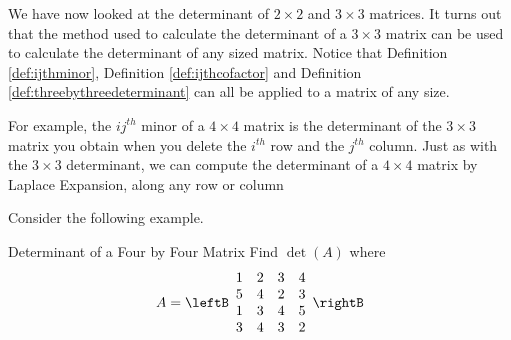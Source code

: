 We have now looked at the determinant of $2 \times 2$ and $3 \times 3$ matrices. It turns
out that the method used to calculate the determinant of a $3 \times 3$ matrix 
can be used to calculate the determinant of any sized matrix. Notice that
Definition \ref{def:ijthminor}, Definition \ref{def:ijthcofactor} and Definition \ref{def:threebythreedeterminant}
can all be applied to a matrix of any size. 

For example, the $ij^{th}$ minor of a $4 \times 4$ matrix is the determinant
of the $3 \times 3$ matrix you obtain when you delete the $i^{th}$ row and the $j^{th}$ column. 
Just as with the $3 \times 3$ determinant, we can compute the determinant of a $4 \times 4$ matrix by Laplace Expansion, 
along any row or column

Consider the following example. 

\begin{example}{Determinant of a Four by Four Matrix}\label{exa:fourbyfourdeterminant}
Find $\det \left( A\right) $ where
\begin{equation*}
A=\leftB
\begin{array}{rrrr}
1 & 2 & 3 & 4 \\
5 & 4 & 2 & 3 \\
1 & 3 & 4 & 5 \\
3 & 4 & 3 & 2
\end{array}
\rightB
\end{equation*}
\end{example}

